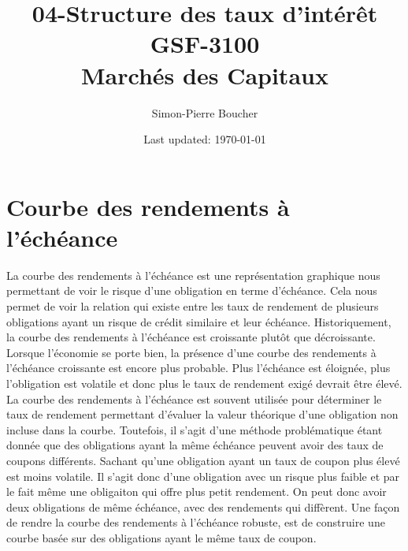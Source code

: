 \documentclass[letterpaper, 12pt]{article}
\newcommand{\1}{\mathds{1}}	%
\theoremstyle{definition}
\begin{document}

\title{04-Structure des taux d’intérêt \\[1em]
\normalsize GSF-3100 \\ Marchés des Capitaux}


\author{\normalsize Simon-Pierre Boucher}
\date{\normalsize\vspace{-1ex} Last updated: \today}


\maketitle
\tableofcontents\label{sec:contents}


\newpage

\section{ Courbe des rendements à l’échéance}
La courbe des rendements à l'échéance est une représentation graphique nous permettant de voir le risque d'une obligation en terme d'échéance.  Cela nous permet de voir la relation qui existe entre les taux de rendement de plusieurs obligations ayant un risque de crédit similaire et leur échéance.  Historiquement,  la courbe des rendements à l’échéance est croissante plutôt que décroissante.  Lorsque l'économie se porte bien,  la présence d'une courbe des rendements à l’échéance croissante est encore plus probable.  Plus l’échéance est éloignée,  plus l’obligation est volatile et donc plus le taux de rendement exigé devrait être élevé.  La courbe des rendements à l'échéance est souvent utilisée pour déterminer le taux de rendement permettant d’évaluer la valeur théorique d’une obligation non incluse dans la courbe.  Toutefois,  il s'agit d'une méthode problématique étant donnée que des obligations ayant la même échéance peuvent avoir des taux de coupons différents.  Sachant qu'une obligation ayant un taux de coupon plus élevé est moins volatile.  Il s'agit donc d'une obligation avec un risque plus faible et par le fait même une obligaiton qui offre plus petit rendement.   On peut donc avoir deux obligations de même échéance,  avec des rendements qui diffèrent. Une  façon de rendre la courbe des rendements à l'échéance robuste,  est de construire une courbe basée sur des obligations ayant le même taux de coupon.
\end{document}
